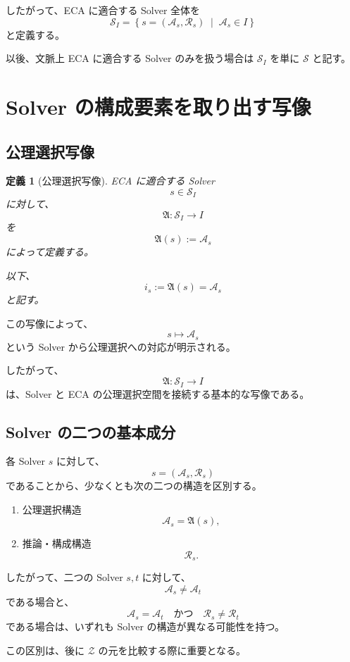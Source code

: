 \documentclass[a4paper,11pt]{jsarticle}
\newtheorem{definition}{定義}[section]
\newcommand{\Solver}{\mathcal{S}}
\newcommand{\Sel}{I}
\begin{document}
したがって、ECA に適合する Solver 全体を
\[
\boxed{
\Solver_{\Sel}
=
\left\{
s=(\mathcal{A}_s,\mathcal{R}_s)
\;\middle|\;
\mathcal{A}_s\in\Sel
\right\}
}
\]
と定義する。

以後、文脈上 ECA に適合する Solver のみを扱う場合は $\Solver_{\Sel}$ を単に $\Solver$ と記す。

\section{Solver の構成要素を取り出す写像}

\subsection{公理選択写像}

\begin{definition}[公理選択写像]
ECA に適合する Solver
\[
s\in\Solver_{\Sel}
\]
に対して、
\[
\mathfrak{A}:\Solver_{\Sel}\longrightarrow\Sel
\]
を
\[
\boxed{
\mathfrak{A}(s):=\mathcal{A}_s
}
\]
によって定義する。

以下、
\[
i_s:=\mathfrak{A}(s)=\mathcal{A}_s
\]
と記す。
\end{definition}

この写像によって、
\[
s\longmapsto\mathcal{A}_s
\]
という Solver から公理選択への対応が明示される。

したがって、
\[
\boxed{
\mathfrak{A}:\Solver_{\Sel}\to\Sel
}
\]
は、Solver と ECA の公理選択空間を接続する基本的な写像である。

\subsection{Solver の二つの基本成分}

各 Solver $s$ に対して、
\[
s=(\mathcal{A}_s,\mathcal{R}_s)
\]
であることから、少なくとも次の二つの構造を区別する。

\begin{enumerate}
\item 公理選択構造
\[
\mathcal{A}_s=\mathfrak{A}(s),
\]
\item 推論・構成構造
\[
\mathcal{R}_s.
\]
\end{enumerate}

したがって、二つの Solver $s,t$ に対して、
\[
\mathcal{A}_s\neq\mathcal{A}_t
\]
である場合と、
\[
\mathcal{A}_s=\mathcal{A}_t
\quad\text{かつ}\quad
\mathcal{R}_s\neq\mathcal{R}_t
\]
である場合は、いずれも Solver の構造が異なる可能性を持つ。

この区別は、後に $\mathcal{Z}$ の元を比較する際に重要となる。
\end{document}
